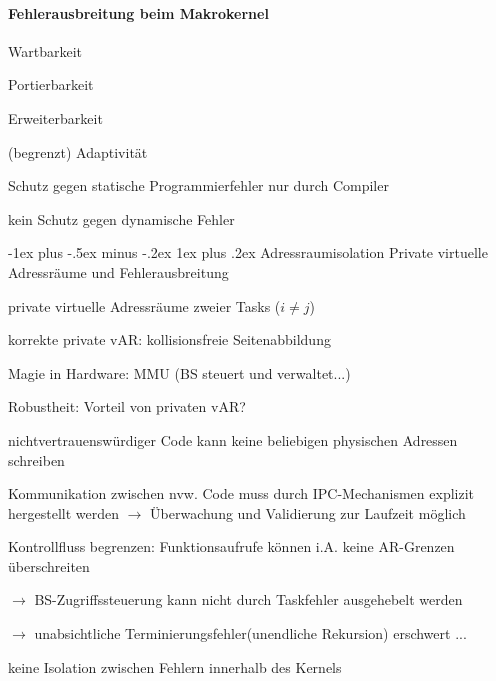 \documentclass[a4paper]{article}
\makeatletter
\newcommand{\cmark}{\ding{51}}
\newcommand{\xmark}{\ding{55}}
\renewcommand{\subsubsection}{\@startsection{subsubsection}{3}{0mm}%
 {-1ex plus -.5ex minus -.2ex}%
 {1ex plus .2ex}%
 {\normalfont\small\bfseries}}
\makeatother
\begin{document}
\begin{multicols}{3}
    \paragraph{Fehlerausbreitung beim Makrokernel}
    \begin{itemize*}
        \item[\cmark] Wartbarkeit
        \item[\cmark] Portierbarkeit
        \item[\cmark] Erweiterbarkeit
        \item (begrenzt) Adaptivität
        \item Schutz gegen statische Programmierfehler nur durch Compiler
        \item[\xmark] kein Schutz gegen dynamische Fehler
    \end{itemize*}

    \subsubsection{Adressraumisolation}
    Private virtuelle Adressräume und Fehlerausbreitung
    \begin{itemize*}
        \item private virtuelle Adressräume zweier Tasks ($i\not= j$)
        \item korrekte private vAR: kollisionsfreie Seitenabbildung
        \item Magie in Hardware: MMU (BS steuert und verwaltet...)
    \end{itemize*}
    Robustheit: Vorteil von privaten vAR?
    \begin{itemize*}
        \item[\cmark] nichtvertrauenswürdiger Code kann keine beliebigen physischen Adressen schreiben
        \item[\cmark] Kommunikation zwischen nvw. Code muss durch IPC-Mechanismen explizit hergestellt werden $\rightarrow$ Überwachung und Validierung zur Laufzeit möglich
        \item[\cmark] Kontrollfluss begrenzen: Funktionsaufrufe können i.A. keine AR-Grenzen überschreiten
        \begin{itemize*}
            \item[$\rightarrow$] BS-Zugriffssteuerung kann nicht durch Taskfehler ausgehebelt werden
            \item[$\rightarrow$] unabsichtliche Terminierungsfehler(unendliche Rekursion) erschwert ...
        \end{itemize*}
        \item keine Isolation zwischen Fehlern innerhalb des Kernels
    \end{itemize*}


\end{multicols}
\end{document}
